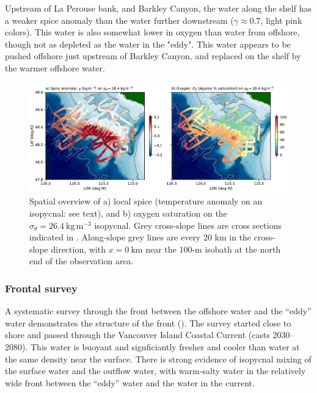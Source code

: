 \documentclass[draft]{agujournal2019}
\begin{document}
Upstream of La Perouse bank, and Barkley Canyon, the water along the shelf has a weaker spice anomaly than the water further downstream ($\gamma \approx 0.7$, light pink colors).  This water is also somewhat lower in oxygen than water from offshore, though not as depleted as the water in the "eddy".  This water appears to be pushed offshore just upstream of Barkley Canyon, and replaced on the shelf by the warmer offshore water.

\begin{figure}[htbp]
  \begin{center}
    \includegraphics[width=6.2in]{SpiceO2264}
    \caption{Spatial overview of a) local spice (temperature anomaly on an isopycnal: see text), and b) oxygen saturation on the $\sigma_{\theta} = 26.4\ \mathrm{kg\,m^{-3}}$ isopycnal.  Grey cross-slope lines are cross sections indicated in .  Along-slope grey lines are every 20 km in the cross-slope direction, with $x=0\ \mathrm{km}$ near the 100-m isobath at the north end of the observation area.
   \label{fig:SpiceO2264}
    }
  \end{center}
\end{figure}

\subsubsection{Frontal survey}

A systematic survey through the front between the offshore water and the ``eddy'' water demonstrates the structure of the front ().  The survey started close to shore and passed through the Vancouver Island Coastal Current (casts 2030--2080).  This water is buoyant and signficiantly fresher and cooler than water at the same density near the surface.  There is strong evidence of isopycnal mixing of the surface water and the outflow water, with warm-salty water in the relatively wide front between the ``eddy'' water and the water in the current.
\end{document}
